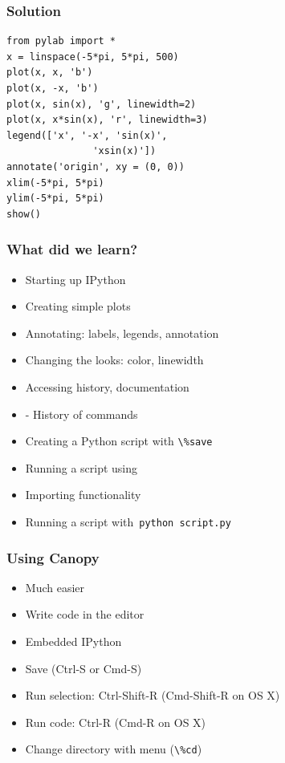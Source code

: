 \documentclass[14pt,compress]{beamer}
\newcounter{time}
\newcommand{\inctime}[1]{\addtocounter{time}{#1}{\tiny \thetime\ m}}
\newcommand{\typ}[1]{\lstinline{#1}}
\newcommand{\kwrd}[1]{ \texttt{\textbf{\color{blue}{#1}}}  }
\begin{document}
\begin{frame}[fragile]
  \frametitle{Solution}
  \small
\begin{lstlisting}
from pylab import *
x = linspace(-5*pi, 5*pi, 500)
plot(x, x, 'b')
plot(x, -x, 'b')
plot(x, sin(x), 'g', linewidth=2)
plot(x, x*sin(x), 'r', linewidth=3)
legend(['x', '-x', 'sin(x)',
               'xsin(x)'])
annotate('origin', xy = (0, 0))
xlim(-5*pi, 5*pi)
ylim(-5*pi, 5*pi)
show()
\end{lstlisting}
\end{frame}



\begin{frame}[fragile]
  \frametitle{What did we learn?}
  \begin{itemize}
    \item Starting up IPython
    \item Creating simple plots
    \item Annotating: labels, legends, annotation
    \item Changing the looks: color, linewidth
    \item Accessing history, documentation
    \item \kwrd{\%hist} - History of commands
    \item Creating a Python script with \typ{\%save}
    \item Running a script using \kwrd{\%run -i}
    \item Importing functionality
    \item Running a script with\ \typ{python script.py}
  \end{itemize}
\end{frame}

\begin{frame}
  \frametitle{Using Canopy}
  \begin{itemize}
  \item Much easier
  \item Write code in the editor
  \item Embedded IPython
  \item Save (Ctrl-S or Cmd-S)
  \item Run selection: Ctrl-Shift-R (Cmd-Shift-R on OS X)
  \item Run code: Ctrl-R (Cmd-R on OS X)
  \item Change directory with menu (\typ{\%cd})
  \end{itemize}
  \inctime{5}
\end{frame}
\end{document}
